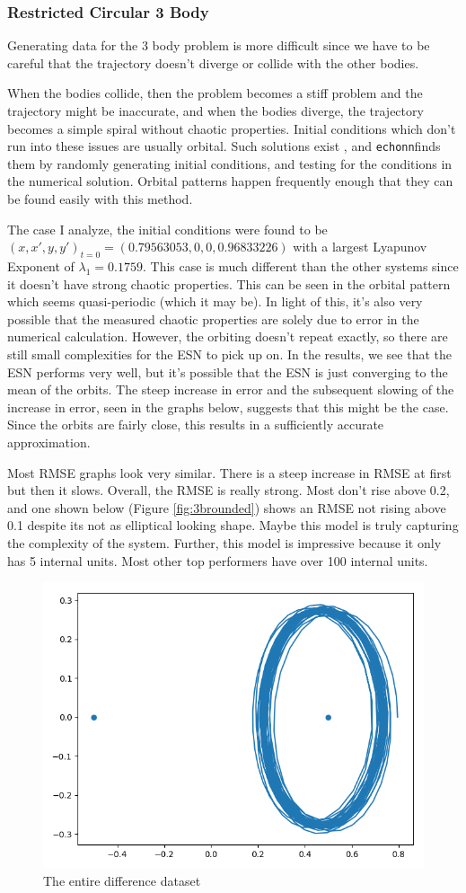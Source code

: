 \documentclass{article}
\newcommand{\echonnsp}{\texttt{echonn}\text{ }}
\begin{document}
\subsubsection{Restricted Circular 3 Body}

Generating data for the 3 body problem is more difficult since we have to be 
careful that the trajectory doesn't diverge or collide with the other bodies. 

When the bodies collide, then the problem becomes a stiff problem and the
trajectory might be inaccurate, and when the bodies diverge, the trajectory
becomes a simple spiral without chaotic properties. Initial conditions which
don't run into these issues are usually orbital. Such solutions exist
\cite{frnkacase}, and \echonnsp finds them by randomly generating initial
conditions, and testing for the conditions in the numerical solution.
Orbital patterns happen frequently
enough that they can be found easily with this method. 

The case I analyze, the initial conditions were found to be 
$(x, x', y, y')_{t=0} = (0.79563053, 0, 0, 0.96833226)$
with a largest Lyapunov Exponent of $\lambda_1 = 0.1759$. This case is
much different than 
the other systems since it doesn't have strong chaotic properties. This can
be seen in the orbital pattern which seems quasi-periodic (which it may be). 
In light of this, it's also very possible that the measured chaotic properties
are solely due to error in the numerical calculation. However, the orbiting
doesn't repeat exactly, so there are still small complexities for the ESN
to pick up on. In the results, we see that the ESN performs very well, but
it's possible that the ESN is just converging to the mean of the orbits. 
The steep increase in error and the subsequent slowing of the increase
in error, seen in the graphs below, suggests that this might be the case.
Since the orbits are fairly close, this results in a sufficiently
accurate approximation.

Most RMSE graphs look very similar. There is a steep increase in RMSE at first
but then it slows. Overall, the RMSE is really strong. Most don't rise above 
0.2, and one shown below (Figure \ref{fig:3brounded}) shows
an RMSE not rising 
above 0.1 despite its not as elliptical looking shape. Maybe this model
is truly capturing the complexity of the system. Further, this model
is impressive because it only has 5 internal units. Most other top performers 
have over 100 internal units.

\begin{figure}[H]
    \centering
    \includegraphics[width=.5\linewidth]{doc/paper/images/r3body/full_differential.png}
    \caption{The entire difference dataset}
\end{figure}
\end{document}
